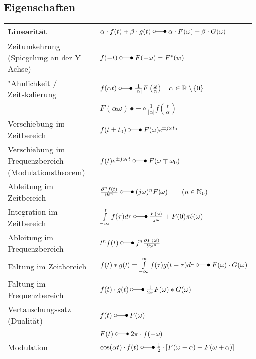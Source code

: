 \subsection{Eigenschaften}
		\begin{tabular}{|p{9cm}|p{8cm}|}
        	\hline
        	Linearität & 
        	$\alpha\cdot f(t) + \beta\cdot g(t) \; \laplace \; \alpha\cdot F(\omega) +
        	\beta\cdot G(\omega)$\\
        	\hline
			Zeitumkehrung (Spiegelung an der Y-Achse)&
			$f(-t) \; \laplace \; F(-\omega) = F^*(w)$ \\
			\hline        	
  			"Ahnlichkeit / Zeitskalierung &
  			$f(\alpha t) \; \laplace \; \frac{1}{|\alpha|}F \left (\frac{\omega}{\alpha} \right)
  			\quad\alpha \in\mathbb{R}\setminus \{0\}$\\
				& $F(\alpha\omega) \bullet-\circ \frac{1}{|\alpha|}f(\frac{t}{\alpha})$ \\
  			\hline
  			Verschiebung im	Zeitbereich &
  			$f(t\pm t_0) \; \laplace \; F(\omega)e^{\pm j\omega t_0}$\\
  			\hline
			Verschiebung im Frequenzbereich (Modulationstheorem) &
			$f(t)e^{\pm j\omega_0 t} \; \laplace \; F(\omega\mp\omega_0)$\\
			\hline
			Ableitung im Zeitbereich &
			$\frac{\partial^n f(t)}{\partial t^n} \; \laplace \; (j\omega)^n F(\omega) \qquad (n \in \mathbb{N}_0)$\\
			\hline
			Integration im Zeitbereich &
			$\int\limits_{-\infty}^{t}f(\tau)d\tau \; \laplace \;
			\frac{F(\omega)}{j\omega}+F(0)\pi\delta(\omega)$\\
			\hline				
			Ableitung im Frequenzbereich &
			$t^n f(t) \; \laplace \; j^n \frac{\partial F(\omega)}{\partial \omega^n}$\\
			\hline		
			Faltung im Zeitbereich &
			$f(t) \ast g(t) = \int\limits_{-\infty}^{\infty} f(\tau)g(t-\tau)d\tau \; \laplace \;
			F(\omega) \cdot G(\omega)$\\
			\hline
			Faltung im Frequenzbereich &
			$f(t) \cdot g(t) \; \laplace \; \frac{1}{2\pi}F(\omega) \ast G(\omega)$\\
			\hline
			Vertauschungssatz (Dualität) &
			$f(t) \; \laplace \; F(\omega)\nonumber$ \\
 			& $F(t) \; \laplace \; 2\pi \cdot f(-\omega)$\\
 			\hline
 			Modulation &
 			$\cos(\alpha t) \cdot f(t)  \; \laplace \;  \frac{1}{2}\cdot
 			\left[F(\omega-\alpha) + F(\omega+\alpha)\right ]$\\

\end{tabular}

